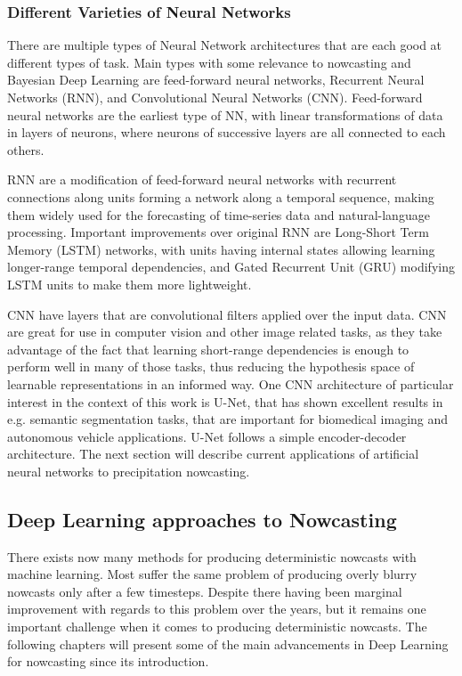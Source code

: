 \subsubsection*{Different Varieties of Neural Networks}
There are multiple types of Neural Network architectures that are each good at different types of task. Main types with some relevance to nowcasting and Bayesian Deep Learning are feed-forward neural networks, Recurrent Neural Networks (RNN), and Convolutional Neural Networks (CNN). Feed-forward neural networks are the earliest type of NN, with linear transformations of data in layers of neurons, where neurons of successive layers are all connected to each others.

 RNN are a modification of feed-forward neural networks with recurrent connections along units forming a network along a temporal sequence, making them widely used for the forecasting of time-series data and natural-language processing. Important improvements over original RNN are Long-Short Term Memory (LSTM) networks, with units having internal states allowing learning longer-range temporal dependencies, and Gated Recurrent Unit (GRU) modifying LSTM units to make them more lightweight. 

CNN have layers that are convolutional filters applied over the input data. CNN are great for use in computer vision and other image related tasks, as they take advantage of the fact that learning short-range dependencies is enough to perform well in many of those tasks, thus reducing the hypothesis space of learnable representations in an informed way. One CNN architecture of particular interest in the context of this work is U-Net, that has shown excellent results in e.g. semantic segmentation tasks, that are important for biomedical imaging and autonomous vehicle applications. U-Net follows a simple encoder-decoder architecture. The next section will describe current applications of artificial neural networks to precipitation nowcasting.



\subsection{Deep Learning approaches to Nowcasting}


There exists now many methods for producing deterministic nowcasts with machine learning. Most suffer the same problem of producing overly blurry nowcasts only after a few timesteps. Despite there having been marginal improvement with regards to this problem over the years, but it remains one important challenge when it comes to producing deterministic nowcasts. The following chapters will present some of the main advancements in Deep Learning for nowcasting since its introduction.

